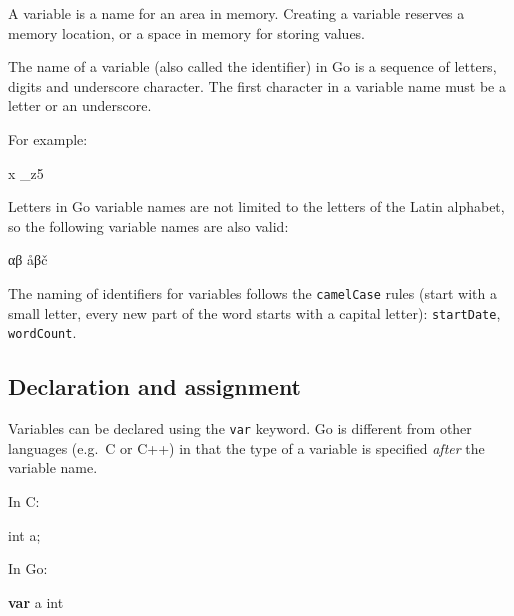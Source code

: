 \documentclass[]{book}
\newenvironment{Shaded}{\begin{snugshade}}{\end{snugshade}}
\newcommand{\DataTypeTok}[1]{\textcolor[rgb]{0.13,0.29,0.53}{#1}}
\newcommand{\KeywordTok}[1]{\textcolor[rgb]{0.13,0.29,0.53}{\textbf{#1}}}
\newcommand{\NormalTok}[1]{#1}
\begin{document}
A variable is a name for an area in memory. Creating a variable reserves a
memory location, or a space in memory for storing values.

The name of a variable (also called the identifier) in Go is a sequence of
letters, digits and underscore character. The first character in a variable
name must be a letter or an underscore.

For example:

\begin{Shaded}
\begin{Highlighting}[]
\NormalTok{x}
\NormalTok{_z5}
\end{Highlighting}
\end{Shaded}

Letters in Go variable names are not limited to the letters of the Latin
alphabet, so the following variable names are also valid:

\begin{Shaded}
\begin{Highlighting}[]
\NormalTok{αβ}
\NormalTok{åβč}
\end{Highlighting}
\end{Shaded}

The naming of identifiers for variables follows the \texttt{camelCase} rules (start
with a small letter, every new part of the word starts with a capital letter):
\texttt{startDate}, \texttt{wordCount}.

\hypertarget{declaration-and-assignment}{%
\subsection{Declaration and assignment}\label{declaration-and-assignment}}

Variables can be declared using the \texttt{var} keyword. Go is different from other
languages (e.g.~C or C++) in that the type of a variable is specified \emph{after}
the variable name.

In C:

\begin{Shaded}
\begin{Highlighting}[]
\DataTypeTok{int}\NormalTok{ a;}
\end{Highlighting}
\end{Shaded}

In Go:

\begin{Shaded}
\begin{Highlighting}[]
\KeywordTok{var}\NormalTok{ a }\DataTypeTok{int}
\end{Highlighting}
\end{Shaded}
\end{document}
